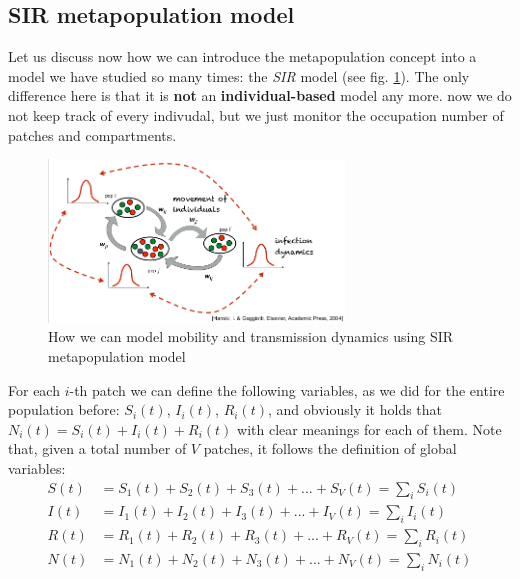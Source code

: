 \documentclass[../main/main.tex]{subfiles}
\begin{document}
\subsection{SIR metapopulation model}

Let us discuss now how we can introduce the metapopulation concept into a model we have studied so many times: the \textit{SIR} model (see fig. \ref{fig:13_06}). The only difference here is that it is \textbf{not} an \textbf{individual-based} model any more. now we do not keep track of every indivudal, but we just monitor the occupation number of patches and compartments.

\begin{figure}[h!]
\centering
\includegraphics[width=0.7\textwidth]{../lessons/image/14/image06.png}
\caption{\label{fig:13_06} How we can model mobility and transmission dynamics using SIR metapopulation model}
\end{figure}

For each $i$-th patch we can define the following variables, as we did for the entire population before: $S_i(t)$, $I_i(t)$, $R_i(t)$, and obviously it holds that $N_i(t) = S_i(t) + I_i(t) + R_i(t)$ with clear meanings for each of them. Note that, given a total number of $V$ patches, it follows the definition of global variables:
\begin{subequations}
\begin{align}
    S(t) &= S_1(t) + S_2(t) + S_3(t) + ... + S_V(t) = \sum_i S_i(t) \\
    I(t) &= I_1(t) + I_2(t) + I_3(t) + ... + I_V(t) = \sum_i I_i(t) \\
    R(t) &= R_1(t) + R_2(t) + R_3(t) + ... + R_V(t) = \sum_i R_i(t) \\
    N(t) &= N_1(t) + N_2(t) + N_3(t) + ... + N_V(t) = \sum_i N_i(t)
\end{align}
\end{subequations}
\end{document}
